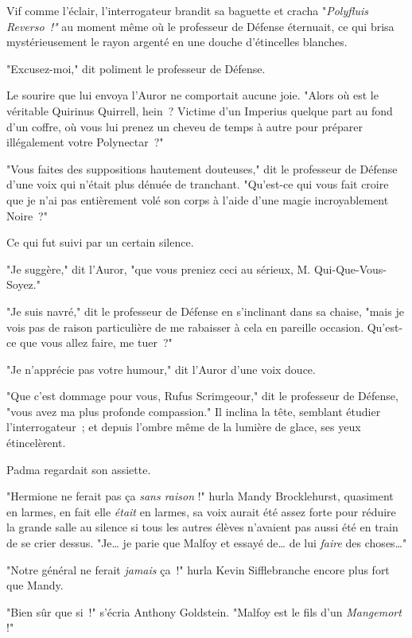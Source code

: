 Vif comme l'éclair, l'interrogateur brandit sa baguette et cracha "\emph{Polyfluis Reverso~!"} au moment même où le professeur de Défense éternuait, ce qui brisa mystérieusement le rayon argenté en une douche d'étincelles blanches.

"Excusez-moi," dit poliment le professeur de Défense.

Le sourire que lui envoya l'Auror ne comportait aucune joie. "Alors où est le véritable Quirinus Quirrell, hein~? Victime d'un Imperius quelque part au fond d'un coffre, où vous lui prenez un cheveu de temps à autre pour préparer illégalement votre Polynectar~?"

"Vous faites des suppositions hautement douteuses," dit le professeur de Défense d'une voix qui n'était plus dénuée de tranchant. "Qu'est-ce qui vous fait croire que je n'ai pas entièrement volé son corps à l'aide d'une magie incroyablement Noire~?"

Ce qui fut suivi par un certain silence.

"Je suggère," dit l'Auror, "que vous preniez ceci au sérieux, M. Qui-Que-Vous-Soyez."

"Je suis navré," dit le professeur de Défense en s'inclinant dans sa chaise, "mais je vois pas de raison particulière de me rabaisser à cela en pareille occasion. Qu'est-ce que vous allez faire, me tuer~?"

"Je n'apprécie pas votre humour," dit l'Auror d'une voix douce.

"Que c'est dommage pour vous, Rufus Scrimgeour," dit le professeur de Défense, "vous avez ma plus profonde compassion." Il inclina la tête, semblant étudier l'interrogateur~; et depuis l'ombre même de la lumière de glace, ses yeux étincelèrent.

\later

Padma regardait son assiette.

"Hermione ne ferait pas ça \emph{sans raison} !" hurla Mandy Brocklehurst, quasiment en larmes, en fait elle \emph{était} en larmes, sa voix aurait été assez forte pour réduire la grande salle au silence si tous les autres élèves n'avaient pas aussi été en train de se crier dessus. "Je… je parie que Malfoy et essayé de… de lui \emph{faire} des choses…"

"Notre général ne ferait \emph{jamais} ça~!" hurla Kevin Sifflebranche encore plus fort que Mandy.

"Bien sûr que si~!" s'écria Anthony Goldstein. "Malfoy est le fils d'un \emph{Mangemort} !"

\later

